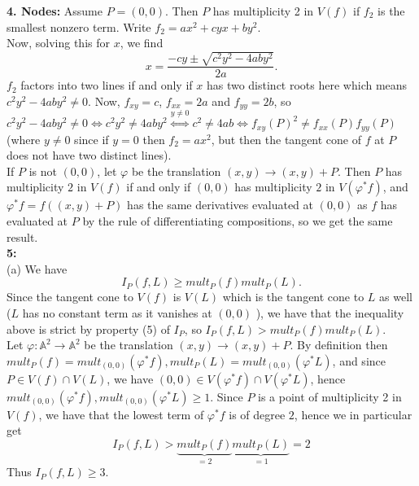 \documentclass[a4paper]{article}
\begin{document}
    \textbf{4. Nodes:} Assume $P = (0,0)$. Then
    $P$ has multiplicity 2 in $V(f)$ if $f_2$ is the smallest nonzero term.
    Write $f_2 = ax^2 + cyx+ by^2$.\\
    Now, solving this for $x$, we find
    \[
    x = \frac{-cy \pm \sqrt{c^2 y^2 - 4 aby^2} }{2a}.
    \] 
    $f_2$ factors into two lines if and only if 
    $x$ has two distinct roots here which means
    $c^2 y^2 - 4aby^2 \neq 0$. Now,
   $f_{xy} = c$, $f_{xx} = 2a$ and $f_{yy} = 2b$, so
   $c^2 y^2 - 4aby^2 \neq 0 \iff
   c^2 y^2 \neq 4 ab y^2 \stackrel{y \neq 0}{\iff} c^2 \neq 4 ab \iff
   f_{xy}(P)^2 \neq f_{x x}(P) f_{yy} (P)$ (where $y\neq 0$ since if
   $y = 0$ then $f_2 = ax^2$, but then the tangent cone of $f$ at $P$ does not
   have two distinct lines).\\
   If $P$ is not $(0,0)$, let $\varphi$ be the translation $(x,y) \to (x,y)
   + P$. Then $P$ has multiplicity $2$ in $V(f)$ if and only if
   $(0,0)$ has multiplicity $2$ in $V\left( \varphi^{*}f \right) $, and
   $\varphi^{*}f = f((x,y)+P)$ has the same derivatives evaluated at $(0,0)$ as
   $f$ has evaluated at $P$ by the rule of differentiating compositions, so we get the
   same result.\\
   \linebreak
   \textbf{5:}\\
   (a)
   We have
   \[
   I_P (f, L) \ge mult_P(f) mult_P(L).
   \] 
   Since the tangent cone to $V(f)$ is $V(L)$ which is the tangent cone to
   $L$ as well ($L$ has no constant term as it vanishes at $(0,0)$ ), we have
   that the inequality above is strict by property (5) of $I_P$, so
   $I_P(f,L) > mult_P(f) mult_P(L)$.\\
   \linebreak
   Let $\varphi  \colon \mathbb{A}^2 \to \mathbb{A}^2$ be the translation
   $(x,y) \to (x,y) + P$. By definition then
   $mult_P(f) = mult_{(0,0)}\left( \varphi^{*}f \right) ,
   mult_P(L) = mult_{(0,0)}\left( \varphi^{*}L \right) $, and since
   $P \in V(f) \cap V(L)$, we have
   $(0,0) \in V\left( \varphi^{*}f \right) \cap V\left( \varphi^{*}L \right) $,
   hence
   $mult_{(0,0)}\left( \varphi^{*}f \right) , mult_{(0,0)}\left( \varphi^{*}L \right) 
   \ge 1$. Since $P$ is a
   point of multiplicity 2 in $V(f)$, we have
   that the lowest term of  $\varphi^{*}f$ is of degree $2$, hence we in
   particular get
   \[
       I_P(f,L) > \underbrace{mult_P(f)}_{= 2} \underbrace{mult_P(L)}_{= 1} = 2
   \] 
   Thus $I_P(f,L)\ge 3$.\\
   \linebreak
\end{document}
